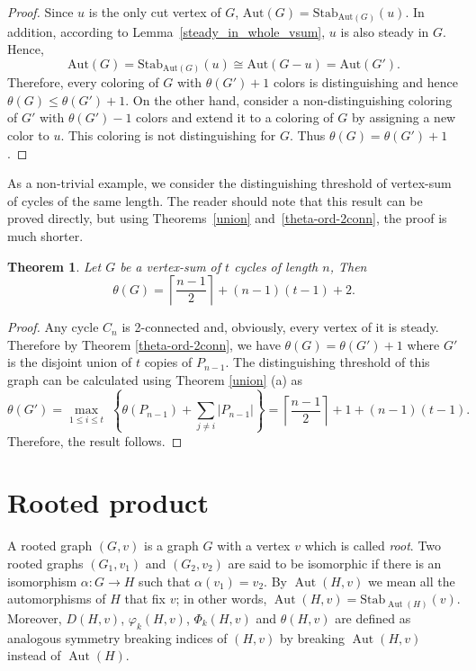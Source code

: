\documentclass[12pt,a4paper, longbibliography]{article}
\newcommand{\Aut}{\ensuremath{\operatorname{Aut}}}
\newcommand{\aut}{\mathrm{Aut}}
\newcommand{\stab}{\mathrm{Stab}}
\newtheorem{theorem}{{\color{THM} Theorem}}[section]
\theoremstyle{definition}
\numberwithin{equation}{section}
\begin{document}
	
	
	\begin{proof}
		Since $u$ is the only cut vertex of $G$, $\aut(G) = \stab_{\aut(G)}(u)$. In addition, according to Lemma~\ref{steady_in_whole_vsum},  $u$ is also steady in $G$. Hence, $$\aut(G) =  \stab_{\aut(G)}(u)\cong \aut(G-u)=\aut(G').$$ 
		Therefore, every coloring of $G$ with  $\theta(G')+1$ colors is distinguishing and hence $\theta(G)\leq \theta(G')+1.$
		On the other hand, consider a non-distinguishing coloring of $G'$ with 
		$\theta(G')-1$ colors and extend it to a coloring of $G$ by assigning  a new color to $u$. This coloring is not distinguishing for $G$. Thus $ \theta(G) = \theta(G')+1$.
	\end{proof}
	
	As a non-trivial example, we consider the distinguishing threshold of vertex-sum of cycles of the same length. The reader should note that this result can be proved directly, but using Theorems~\ref{union} and~\ref{theta-ord-2conn}, the proof is much shorter.
	
	\begin{theorem}
		Let $G$ be a vertex-sum of $t$ cycles of length $n$, Then
		\[\theta(G) = \left\lceil \frac{n-1}{2}\right\rceil + (n-1)(t-1)+2.\]
	\end{theorem}
	\begin{proof}
		Any cycle $C_n$ is 2-connected and, obviously, every vertex of it is steady. Therefore by Theorem \ref{theta-ord-2conn}, we have $\theta(G)=\theta (G')+1$ where $G'$ is the disjoint union of $t$ copies of $P_{n-1}$. The distinguishing threshold of this graph can be calculated using Theorem \ref{union} (a) as  
		\[\theta(G') = \max_{1\leq i\leq t} \; \left\{\theta(P_{n-1}) + \sum_{j \neq i}|P_{n-1}| \right\}=\left\lceil \frac{n-1}{2}\right\rceil+1 + (n-1)(t-1).\]
		Therefore, the result follows.
	\end{proof}
	
	
	
	
	

	
	\section{Rooted product}\label{rooted}
	A rooted graph $(G,v)$ is a graph $G$ with a vertex $v$ which is called \emph{root}. Two rooted graphs $(G_1 , v_1)$ and $(G_2 , v_2)$ are said to be isomorphic if there is an isomorphism $\alpha: G\rightarrow H$ such that $\alpha(v_1)=v_2$. By $\Aut(H,v)$ we mean all the automorphisms of $H$ that fix $v$; in other words, $\Aut(H,v)=\mathrm{Stab}_{\Aut(H)} (v)$. Moreover, $D(H,v)$, $\varphi_k (H,v)$, $\Phi_k (H,v)$ and $\theta (H,v)$ are defined as analogous symmetry breaking indices of $(H,v)$ by breaking $\Aut(H,v)$ instead of $\Aut(H)$. 
	
\end{document}
